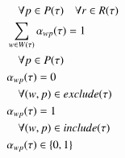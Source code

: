 \begin{alignat}{2}
	& \quad \forall \ElementPeriod \in \SetPeriod \quad \forall \ElementResource \in \SetResource                                                                                                                  \label{eqn:capacity_constraint}                                                             \\
	& \sum_{\ElementWorkOrder \in \SetWorkOrder{}} \VarStrategicWorkOrderAssignment{\ElementWorkOrder}{\ElementPeriod} = 1 \notag                                                                                                                                                                              \\
	& \quad \forall \ElementPeriod \in \SetPeriod                      \label{eqn:single_workorder_constraint}                                                                                                                                                                                                 \\
	& \VarStrategicWorkOrderAssignment{\ElementWorkOrder}{\ElementPeriod} = 0 \notag                                                                                                                                                                                                                           \\
	& \quad \forall (\ElementWorkOrder, \ElementPeriod) \in \ParStrategicExclude                          \label{eqn:exclusion_constraint}                                                                                                                                                                     \\
	& \VarStrategicWorkOrderAssignment{\ElementWorkOrder}{\ElementPeriod} = 1 \notag                                                                                                                                                                                                                           \\ 
	& \quad \forall (\ElementWorkOrder, \ElementPeriod) \in \ParStrategicInclude                          \label{eqn:inclusion_constraint}                                                                                                                                                                     \\
	& \VarStrategicWorkOrderAssignment{\ElementWorkOrder}{\ElementPeriod} \in \{0, 1\} \notag                                                                                                                                                                                                                  \\

\end{alignat}

